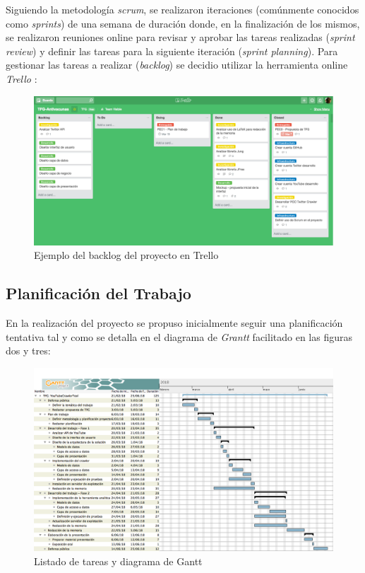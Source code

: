 \documentclass[11pt,a4paper]{article}
\begin{document}
Siguiendo la metodología \textit{scrum}, se realizaron iteraciones (comúnmente conocidos como \textit{sprints}) de una semana de duración donde, en la finalización de los mismos, se realizaron reuniones online para revisar y aprobar las tareas realizadas (\textit{sprint review}) y definir las tareas para la siguiente iteración (\textit{sprint planning}). Para gestionar las tareas a realizar (\textit{backlog}) se decidio utilizar la herramienta online \textit{Trello} \cite{9}:
\\

\begin{figure}[hbtp]
\centering
\includegraphics[scale=0.28]{planificacion/trello-backlog.png}
\caption{Ejemplo del backlog del proyecto en Trello}
\end{figure}
\medskip 

\subsection{Planificación del Trabajo}\label{planificacionTrabajao} 
En la realización del proyecto se propuso inicialmente seguir una planificación tentativa tal y como se detalla en el diagrama de \textit{Grantt} facilitado en las figuras dos y tres:

\begin{figure}[H]
\centering
\includegraphics[scale=0.25]{planificacion/planificacion.png}
\caption{Listado de tareas y diagrama de Gantt}
\end{figure}
\end{document}
